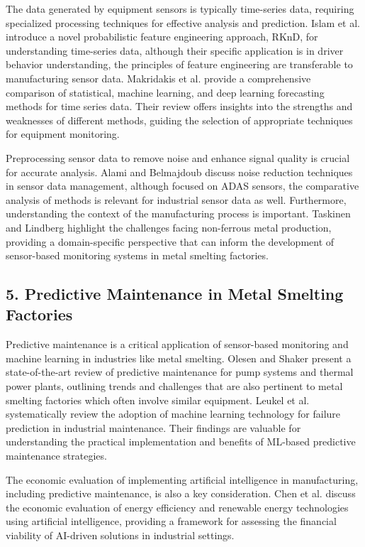 The data generated by equipment sensors is typically time-series data, requiring specialized processing techniques for effective analysis and prediction. Islam et al. \cite{islam-2024} introduce a novel probabilistic feature engineering approach, RKnD, for understanding time-series data, although their specific application is in driver behavior understanding, the principles of feature engineering are transferable to manufacturing sensor data.  Makridakis et al. \cite{makridakis-2022} provide a comprehensive comparison of statistical, machine learning, and deep learning forecasting methods for time series data. Their review offers insights into the strengths and weaknesses of different methods, guiding the selection of appropriate techniques for equipment monitoring.

Preprocessing sensor data to remove noise and enhance signal quality is crucial for accurate analysis. Alami and Belmajdoub \cite{alami-2024} discuss noise reduction techniques in sensor data management, although focused on ADAS sensors, the comparative analysis of methods is relevant for industrial sensor data as well.  Furthermore, understanding the context of the manufacturing process is important. Taskinen and Lindberg \cite{taskinen-2024} highlight the challenges facing non-ferrous metal production, providing a domain-specific perspective that can inform the development of sensor-based monitoring systems in metal smelting factories.

\subsection*{5. Predictive Maintenance in Metal Smelting Factories}

Predictive maintenance is a critical application of sensor-based monitoring and machine learning in industries like metal smelting. Olesen and Shaker \cite{olesen-2020} present a state-of-the-art review of predictive maintenance for pump systems and thermal power plants, outlining trends and challenges that are also pertinent to metal smelting factories which often involve similar equipment. Leukel et al. \cite{leukel-2021} systematically review the adoption of machine learning technology for failure prediction in industrial maintenance. Their findings are valuable for understanding the practical implementation and benefits of ML-based predictive maintenance strategies.

The economic evaluation of implementing artificial intelligence in manufacturing, including predictive maintenance, is also a key consideration. Chen et al. \cite{chen-2021} discuss the economic evaluation of energy efficiency and renewable energy technologies using artificial intelligence, providing a framework for assessing the financial viability of AI-driven solutions in industrial settings.

